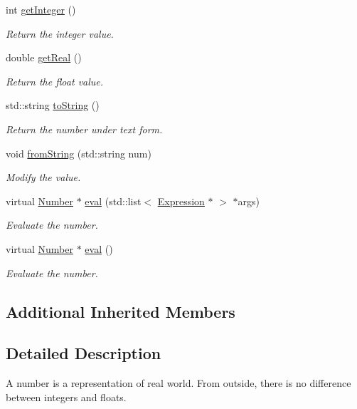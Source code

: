\begin{DoxyCompactItemize}
int \hyperlink{class_number_aef8e2baf2618ca24c077b7c285404629}{get\-Integer} ()
\begin{DoxyCompactList}\small\item\em Return the integer value. \end{DoxyCompactList}\item 
double \hyperlink{class_number_ab6e8e40c3104739f8cef48deb0dc048a}{get\-Real} ()
\begin{DoxyCompactList}\small\item\em Return the float value. \end{DoxyCompactList}\item 
std\-::string \hyperlink{class_number_a6fccb9ac17ca1aa8f3eec1ed10315348}{to\-String} ()
\begin{DoxyCompactList}\small\item\em Return the number under text form. \end{DoxyCompactList}\item 
void \hyperlink{class_number_abfd4a9fecbc0e56985893037cd066404}{from\-String} (std\-::string num)
\begin{DoxyCompactList}\small\item\em Modify the value. \end{DoxyCompactList}\item 
virtual \hyperlink{class_number}{Number} $\ast$ \hyperlink{class_number_af3b04493ef934bb571ebb71b8a5b4283}{eval} (std\-::list$<$ \hyperlink{class_expression}{Expression} $\ast$ $>$ $\ast$args)
\begin{DoxyCompactList}\small\item\em Evaluate the number. \end{DoxyCompactList}\item 
virtual \hyperlink{class_number}{Number} $\ast$ \hyperlink{class_number_ac6a27d78d44abe16f38d64f70cacf246}{eval} ()
\begin{DoxyCompactList}\small\item\em Evaluate the number. \end{DoxyCompactList}\end{DoxyCompactItemize}
\subsection*{Additional Inherited Members}


\subsection{Detailed Description}
A number is a representation of real world. From outside, there is no difference between integers and floats. 

